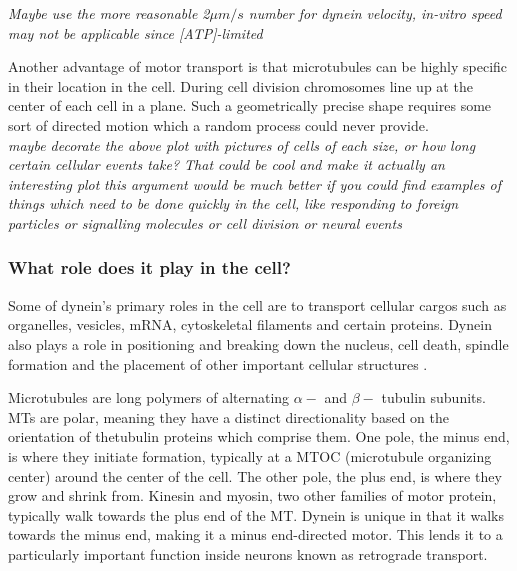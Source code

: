 \documentclass[10pt]{article} %
\begin{document}
\textit{Maybe use the more reasonable 2$\mu m / s$ number for dynein velocity, in-vitro speed may not be applicable since [ATP]-limited}

Another advantage of motor transport is that microtubules can be highly specific in their location in the cell. During cell division chromosomes line up at the center of each cell in a plane. Such a geometrically precise shape requires some sort of directed motion which a random process could never provide.\\

\textit{maybe decorate the above plot with pictures of cells of each size, or how long certain cellular events take? That could be cool and make it actually an interesting plot}
\textit{this argument would be much better if you could find examples of things which need to be done quickly in the cell, like responding to foreign particles or signalling molecules or cell division or neural events}

\subsubsection{What role does it play in the cell?}
Some of dynein's primary roles in the cell are to transport cellular cargos such as organelles, vesicles, mRNA, cytoskeletal filaments and certain proteins. Dynein also plays a role in positioning and breaking down the nucleus, cell death, spindle formation and the placement of other important cellular structures \cite{valetoolbox}.

Microtubules are long polymers of alternating $\alpha-$ and $\beta-$ tubulin subunits. MTs are polar, meaning they have a distinct directionality based on the orientation of thetubulin proteins which comprise them. One pole, the minus end, is where they initiate formation, typically at a MTOC (microtubule organizing center) around the center of the cell. The other pole, the plus end, is where they grow and shrink from. Kinesin and myosin, two other families of motor protein, typically walk towards the plus end of the MT. Dynein is unique in that it walks towards the minus end, making it a minus end-directed motor. This lends it to a particularly important function inside neurons known as retrograde transport.\\
\end{document}
